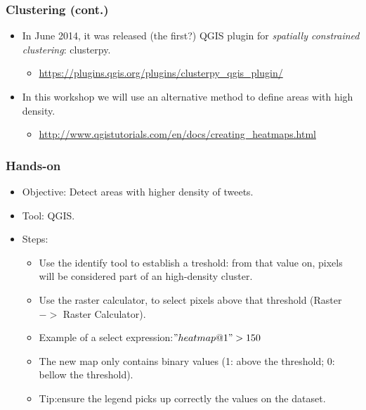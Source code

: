 \documentclass[hyperref={pdfpagelabels=true}]{beamer}
\begin{document}
\begin{frame}
\frametitle{Clustering (cont.)}

    \begin{itemize}
      \item<1->In June 2014, it was released (the first?) QGIS plugin for \textit{spatially constrained clustering}: clusterpy.
      \begin{itemize}
	\item<1->\url{https://plugins.qgis.org/plugins/clusterpy\_qgis\_plugin/}
      \end{itemize}          
      \item<1->In this workshop we will use an alternative method to define areas with high density.
      \begin{itemize}
	\item<1->\url{http://www.qgistutorials.com/en/docs/creating_heatmaps.html}
      \end{itemize}          
    \end{itemize}    

    
\end{frame}


\begin{frame}
\frametitle{Hands-on}
\begin{itemize}
  \item<1->Objective: Detect areas with higher density of tweets.
  \item<1->Tool: QGIS.
  \item<1->Steps:  
  \begin{itemize}
    \item<2->Use the identify tool to establish a treshold: from that value on, pixels will be considered part of an high-density cluster.  
    \item<2->Use the raster calculator, to select pixels above that threshold (Raster $->$ Raster Calculator).
    \item<2->Example of a select expression:$"heatmap@1">150$    
    \item<3->The new map only contains binary values (1: above the threshold; 0: bellow the threshold).
    \item<3->Tip:ensure the legend picks up correctly the values on the dataset.
  \end{itemize}    
\end{itemize}  
\end{frame}
\end{document}

